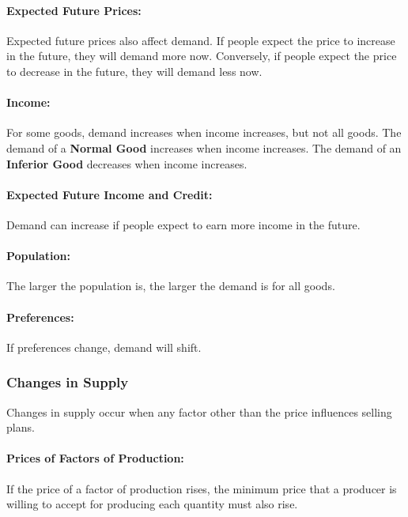 \documentclass{article}
\begin{document}
\paragraph{Expected Future Prices:}
Expected future prices also affect demand. If people expect the price to
increase in the future, they will demand more now. Conversely, if people
expect the price to decrease in the future, they will demand less now.

\paragraph{Income:}
For some goods, demand increases when income increases, but not all goods.
The demand of a \textbf{Normal Good} increases when income increases. The
demand of an \textbf{Inferior Good} decreases when income increases.

\paragraph{Expected Future Income and Credit:}
Demand can increase if people expect to earn more income in the future.

\paragraph{Population:} The larger the population is, the larger the demand is
for all goods.

\paragraph{Preferences:} If preferences change, demand will shift.

\subsubsection{Changes in Supply}
Changes in supply occur when any factor other than the price influences selling plans.

\paragraph{Prices of Factors of Production:}
If the price of a factor of production rises, the minimum price that a producer
is willing to accept for producing each quantity must also rise.
\end{document}
